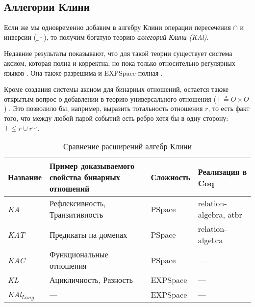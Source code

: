 \documentclass[times
              ,specification
              ,annotation
              ]{itmo-student-thesis}
\begin{document}

    \subsection{Аллегории Клини}
      Если же мы одновременно добавим в алгебру Клини операции пересечения $\cap$ и инверсии ($\_^{\smile}$),
      то получим богатую теорию \textit{аллегорий Клини (KAl)}.

      Недавние результаты показывают, что для такой теории существует система аксиом, которая полна и
      корректна, но пока только относительно регулярных языков \cite{axioms_kal}. Она также разрешима
      и EXPSpace-полная \cite{dec_kal}.

      Кроме создания системы аксиом для бинарных отношений, остается также открытым вопрос о добавлении
      в теорию универсального отношения ($\top \triangleq O \times O $) \cite{axioms_kal}. Это позволило бы, например,
      выразить тотальность отношения $r$, то есть факт того, что между любой парой событий есть ребро
      хотя бы в одну сторону: $\top \leq r \cup r^\smile$.

    \begin{table}[!h]
      \caption{Сравнение расширений алгебр Клини}
      \label{tab:compare_algebras}
      \centering
      \begin{tabularx}{\textwidth}{|>{\hsize}Y|
        >{\hsize}Y|Y|Y|}\hline
        Название & Пример доказываемого свойства бинарных отношений & Сложность & Реализация в Coq
        \\\hline
        \textit{KA} & Рефлексивность, Транзитивность & PSpace & relation-algebra, atbr
        \\\hline
        \textit{KAT} & Предикаты на доменах & PSpace & relation-algebra
        \\\hline
        \textit{KAC} & Функциональные отношения & PSpace & ---
        \\\hline
        \textit{KL}  & Ацикличность, Разность & EXPSpace & ---
        \\\hline
        \textit{KAl}$_{Lang}$ & --- & EXPSpace & ---
        \\\hline
      \end{tabularx}
    \end{table}
\end{document}
